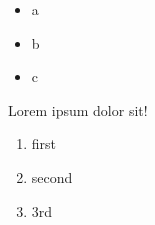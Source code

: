 \begin{itemize}

\item a

\item b

\item c

\end{itemize}
Lorem ipsum dolor sit!

\begin{enumerate}

\item first

\item second

\item 3rd

\end{enumerate}
